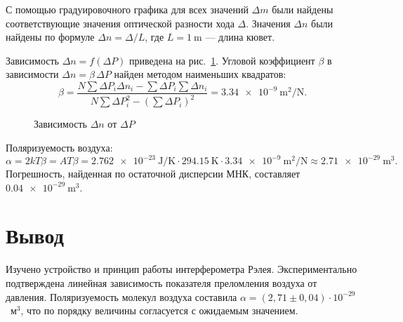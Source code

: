 \documentclass[14pt,a4paper]{extarticle}
\begin{document}
С помощью градуировочного графика для всех значений $\Delta m$ были найдены соответствующие значения оптической разности хода $\Delta$.
Значения $\Delta n$ были найдены по формуле $\Delta n = \Delta / L$, где $L = \SI{1}{\metre}$ --- длина кювет.

Зависимость $\Delta n = f(\Delta P)$ приведена на рис.~\ref{fig:dn}. Угловой коэффициент $\beta$ в зависимости $\Delta n = \beta\,\Delta P$ найден методом наименьших квадратов:
\[
\beta = \frac{N\sum \Delta P_i \Delta n_i - \sum \Delta P_i \sum \Delta n_i}{N\sum \Delta P_i^2 - \left(\sum \Delta P_i\right)^2}
= \SI{3,34e-9}{\square\metre\per\newton}.
\]

\begin{figure}[htbp]
\centering
{}
\caption{Зависимость $\Delta n$ от $\Delta P$}
\label{fig:dn}
\end{figure}

Поляризуемость воздуха:
\[
\alpha = 2kT\beta = A T \beta = \SI{2,762e-23}{\joule\per\kelvin} \cdot \SI{294,15}{\kelvin} \cdot \SI{3,34e-9}{\square\metre\per\newton} \approx \SI{2,71e-29}{\cubic\metre}.
\]
Погрешность, найденная по остаточной дисперсии МНК, составляет $\SI{0,04e-29}{\cubic\metre}$.

\section*{Вывод}

Изучено устройство и принцип работы интерферометра Рэлея. Экспериментально подтверждена линейная зависимость показателя преломления воздуха от давления. Поляризуемость молекул воздуха составила $\alpha = (2{,}71 \pm 0{,}04)\cdot 10^{-29}$~м$^3$, что по порядку величины согласуется с ожидаемым значением.
\end{document}
